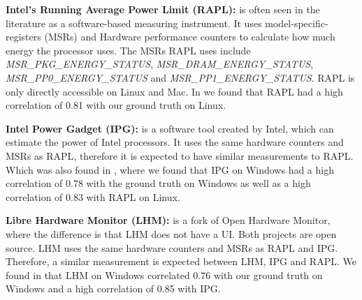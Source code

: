 \noindent\textbf{Intel's Running Average Power Limit (RAPL):} is often seen in the literature as a software-based measuring instrument.\cite{biksbois} It uses model-specific-registers (MSRs) and Hardware performance counters to calculate how much energy the processor uses. The MSRs RAPL uses include \textit{MSR\_PKG\_ENERGY\_STATUS}, \textit{MSR\_DRAM\_ENERGY\_STATUS}, \textit{MSR\_PP0\_ENERGY\_STATUS} and \textit{MSR\_PP1\_ENERGY\_STATUS}. %
RAPL is only directly accessible on Linux and Mac. In \cite{biksbois} we found that RAPL had a high correlation of 0.81 with our ground truth on Linux.\cite{biksbois}\newline

\noindent\textbf{Intel Power Gadget (IPG):} is a software tool created by Intel, which can estimate the power of Intel processors. %
It uses the same hardware counters and MSRs as RAPL\cite{FireFox}, therefore it is expected to have similar measurements to RAPL. Which was also found in \cite{biksbois}, where we found that IPG on Windows had a high correlation of 0.78 with the ground truth on Windows as well as a high correlation of 0.83 with RAPL on Linux.\cite{biksbois}\newline





\noindent\textbf{Libre Hardware Monitor (LHM):} is a fork of Open Hardware Monitor, where the difference is that LHM does not have a UI.\cite{LHM} Both projects are open source. LHM uses the same hardware counters and MSRs as RAPL and IPG.%
Therefore, a similar measurement is expected between LHM, IPG and RAPL. We found in \cite{biksbois} that LHM on Windows correlated 0.76 with our ground truth on Windows and a high correlation of 0.85 with IPG.\newline

